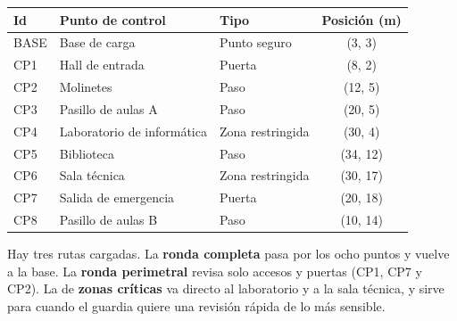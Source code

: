\begin{table}[H]
\centering\small
\begin{tabularx}{\textwidth}{@{}l L l c@{}}
\toprule
\textbf{Id} & \textbf{Punto de control} & \textbf{Tipo} & \textbf{Posición (m)} \\
\midrule
BASE & Base de carga & Punto seguro & (3, 3) \\
CP1 & Hall de entrada & Puerta & (8, 2) \\
CP2 & Molinetes & Paso & (12, 5) \\
CP3 & Pasillo de aulas A & Paso & (20, 5) \\
CP4 & Laboratorio de informática & Zona restringida & (30, 4) \\
CP5 & Biblioteca & Paso & (34, 12) \\
CP6 & Sala técnica & Zona restringida & (30, 17) \\
CP7 & Salida de emergencia & Puerta & (20, 18) \\
CP8 & Pasillo de aulas B & Paso & (10, 14) \\
\bottomrule
\end{tabularx}
\end{table}

Hay tres rutas cargadas. La \textbf{ronda completa} pasa por los ocho puntos y vuelve a la base. La \textbf{ronda perimetral} revisa solo accesos y puertas (CP1, CP7 y CP2). La de \textbf{zonas críticas} va directo al laboratorio y a la sala técnica, y sirve para cuando el guardia quiere una revisión rápida de lo más sensible.
